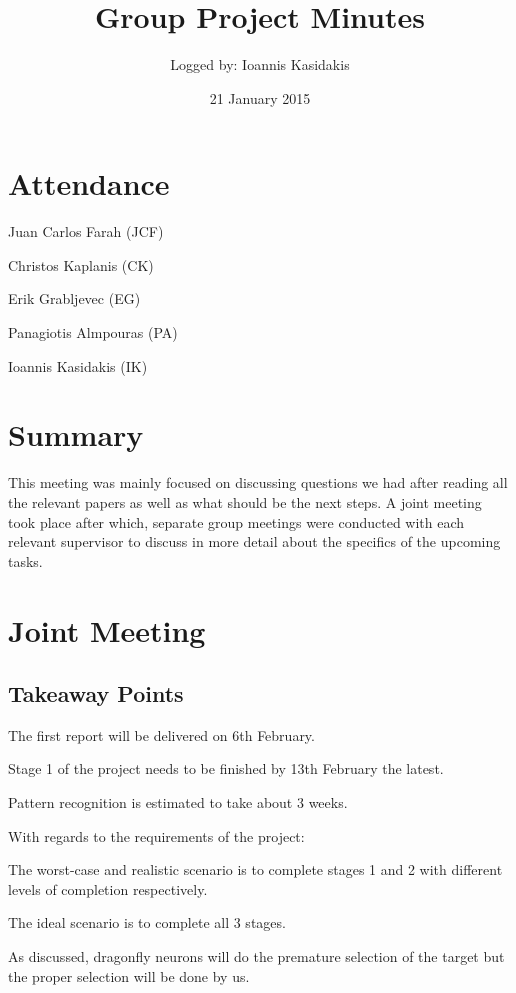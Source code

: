 \documentclass{article}
\title{Group Project Minutes}
\author{Logged by: Ioannis Kasidakis}
\date{21 January 2015}
\begin{document}
\maketitle

\section*{Attendance}
\begin{compactenum}
\item Juan Carlos Farah (JCF)
\item Christos Kaplanis (CK)
\item Erik Grabljevec (EG)
\item Panagiotis Almpouras (PA)
\item Ioannis Kasidakis (IK)
\end{compactenum}

\section*{Summary}
This meeting was mainly focused on discussing questions we had after reading all the relevant papers as well as what should be the next steps. A joint meeting took place after which, separate group meetings were conducted with each relevant supervisor to discuss in more detail about the specifics of the upcoming tasks.

\section*{Joint Meeting}

{\addtolength{\leftskip}{3mm}
\subsection*{Takeaway Points}
}
\begin{compactenum}
\item The first report will be delivered on 6th February.
\item Stage 1 of the project needs to be finished by 13th February the latest.
\item Pattern recognition is estimated to take about 3 weeks.
\item With regards to the requirements of the project:
	\begin{compactenum}
	\item The worst-case and realistic scenario is to complete stages 1 and 2 with different levels of completion respectively.
	\item The ideal scenario is to complete all 3 stages.
	\end{compactenum}
\item As discussed, dragonfly neurons will do the premature selection of the target but the proper selection will be done by us.
\end{compactenum}
\end{document}
